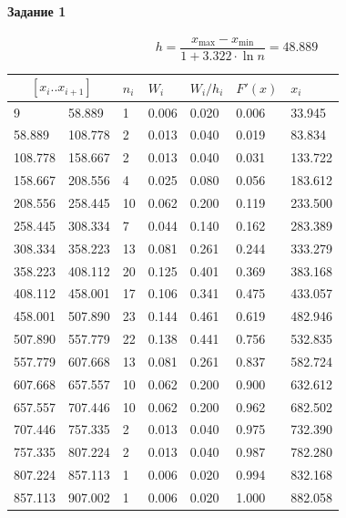 \paragraph{Задание 1}

\[h = \frac{x_{\max} - x_{\min}}{1 + 3.322\cdot\ln{n}} = 48.889\]

\begin{table}[h]
    \begin{center}
        \begin{tabular}{|l|l|l|l|l|l|l|}
            \hline
            \multicolumn{2}{|c|}{$[x_{i}..x_{i+1}]$} & $n_{i}$ & $W_{i}$ & $W_{i}/h_{i}$ & $F{}'(x)$
            & $x_{i}$
            \\
            \hline
            9       & 58.889  & 1  & 0.006 & 0.020 & 0.006 & 33.945  \\
            \hline
            58.889  & 108.778 & 2  & 0.013 & 0.040 & 0.019 & 83.834  \\
            \hline
            108.778 & 158.667 & 2  & 0.013 & 0.040 & 0.031 & 133.722 \\
            \hline
            158.667 & 208.556 & 4  & 0.025 & 0.080 & 0.056 & 183.612 \\
            \hline
            208.556 & 258.445 & 10 & 0.062 & 0.200 & 0.119 & 233.500 \\
            \hline
            258.445 & 308.334 & 7  & 0.044 & 0.140 & 0.162 & 283.389 \\
            \hline
            308.334 & 358.223 & 13 & 0.081 & 0.261 & 0.244 & 333.279 \\
            \hline
            358.223 & 408.112 & 20 & 0.125 & 0.401 & 0.369 & 383.168 \\
            \hline
            408.112 & 458.001 & 17 & 0.106 & 0.341 & 0.475 & 433.057 \\
            \hline
            458.001 & 507.890 & 23 & 0.144 & 0.461 & 0.619 & 482.946 \\
            \hline
            507.890 & 557.779 & 22 & 0.138 & 0.441 & 0.756 & 532.835 \\
            \hline
            557.779 & 607.668 & 13 & 0.081 & 0.261 & 0.837 & 582.724 \\
            \hline
            607.668 & 657.557 & 10 & 0.062 & 0.200 & 0.900 & 632.612 \\
            \hline
            657.557 & 707.446 & 10 & 0.062 & 0.200 & 0.962 & 682.502 \\
            \hline
            707.446 & 757.335 & 2  & 0.013 & 0.040 & 0.975 & 732.390 \\
            \hline
            757.335 & 807.224 & 2  & 0.013 & 0.040 & 0.987 & 782.280 \\
            \hline
            807.224 & 857.113 & 1  & 0.006 & 0.020 & 0.994 & 832.168 \\
            \hline
            857.113 & 907.002 & 1  & 0.006 & 0.020 & 1.000 & 882.058 \\
            \hline
        \end{tabular}
    \end{center}
\end{table}

